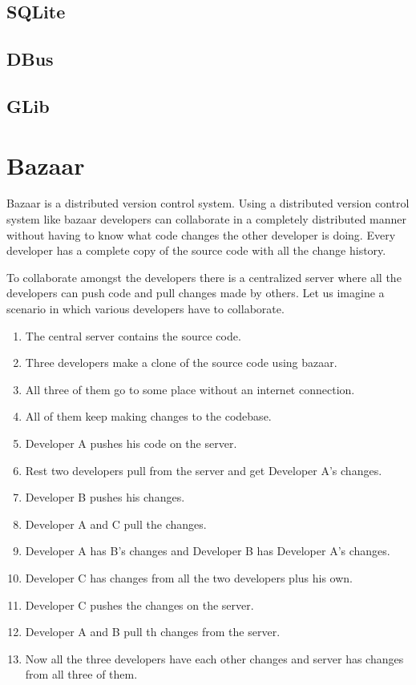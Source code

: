 \subsection{SQLite}
\subsection{DBus}
\subsection{GLib}

\section{Bazaar}
Bazaar is a distributed version control system. Using a distributed version control 
system like bazaar developers can collaborate in a completely distributed manner 
without having to know what code changes the other developer is doing. Every developer 
has a complete copy of the source code with all the change history.

To collaborate amongst the developers there is a centralized server where all the 
developers can push code and pull changes made by others. Let us imagine a scenario 
in which various developers have to collaborate.
\begin{enumerate}
\item The central server contains the source code.
\item Three developers make a clone of the source code using bazaar.
\item All three of them go to some place without an internet connection.
\item All of them keep making changes to the codebase.
\item Developer A pushes his code on the server.
\item Rest two developers pull from the server and get Developer A's changes.
\item Developer B pushes his changes.
\item Developer A and C pull the changes.
\item Developer A has B's changes and Developer B has Developer A's changes.
\item Developer C has changes from all the two developers plus his own.
\item Developer C pushes the changes on the server.
\item Developer A and B pull th changes from the server.
\item Now all the three developers have each other changes and server has changes 
from all three of them.
\end{enumerate}

